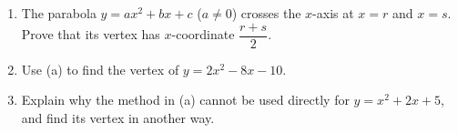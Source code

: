 \begin{enumerate}
\item[(a)] The parabola $y=ax^2+bx+c$ ($a\ne0$) crosses the $x$-axis at $x=r$ and $x=s$. Prove that its vertex has $x$-coordinate $\dfrac{r+s}{2}$.
\item[(b)] Use (a) to find the vertex of $y=2x^2-8x-10$.
\item[(c)] Explain why the method in (a) cannot be used directly for $y=x^2+2x+5$, and find its vertex in another way.
\end{enumerate}
